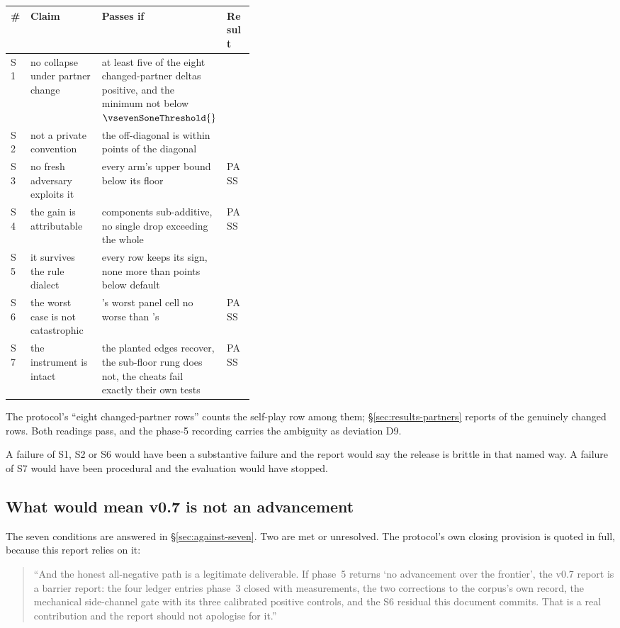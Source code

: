 \begin{center}\small
\begin{tabular}{llp{0.40\linewidth}l}
\toprule
\# & Claim & Passes if & Result \\
\midrule
S1 & no collapse under partner change & at least five of the eight changed-partner deltas positive,
and the minimum not below $\vsevenSoneThreshold{}$ & \vsevenSoneVerdict{} \\
S2 & not a private convention & the off-diagonal is within \vsevenStwoThreshold{} points of the diagonal & \vsevenStwoVerdict{} \\
S3 & no fresh adversary exploits it & every arm's upper bound below its floor & PASS \\
S4 & the gain is attributable & components sub-additive, no single drop exceeding the whole & PASS \\
S5 & it survives the rule dialect & every row keeps its sign, none more than \vsevenSfiveTolerance{} points below default & \vsevenSfiveVerdict{} \\
S6 & the worst case is not catastrophic & \frozen{}'s worst panel cell no worse than \incumbent{}'s & PASS \\
S7 & the instrument is intact & the planted edges recover, the sub-floor rung does not, the cheats fail exactly their own tests & PASS \\
\bottomrule
\end{tabular}
\end{center}

The protocol's ``eight changed-partner rows'' counts the self-play row among them; \S\ref{sec:results-partners}
reports \vsevenSonePositive{} of the \vsevenSoneRows{} genuinely changed rows. Both readings pass, and
the phase-5 recording carries the ambiguity as deviation D9.

A failure of S1, S2 or S6 would have been a substantive failure and the report would say the release is
brittle in that named way. A failure of S7 would have been procedural and the evaluation would have
stopped.

\subsection*{What would mean v0.7 is not an advancement}

The seven conditions are answered in \S\ref{sec:against-seven}. Two are met or unresolved. The
protocol's own closing provision is quoted in full, because this report relies on it:

\begin{quote}\small
``And the honest all-negative path is a legitimate deliverable. If phase~5 returns `no advancement over
the frontier', the v0.7 report is a barrier report: the four ledger entries phase~3 closed with
measurements, the two corrections to the corpus's own record, the mechanical side-channel gate with its
three calibrated positive controls, and the S6 residual this document commits. That is a real
contribution and the report should not apologise for it.''
\end{quote}
